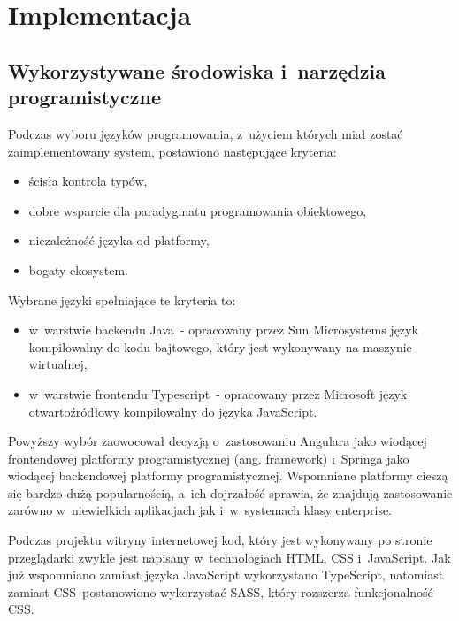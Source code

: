 \chapter{Implementacja}\label{ch:implementation}
\section{Wykorzystywane środowiska i~narzędzia programistyczne}\label{sec:dev-tools}

Podczas wyboru języków programowania, z~użyciem których miał zostać zaimplementowany system, postawiono następujące kryteria:

\begin{itemize}
    \item ścisła kontrola typów,
    \item dobre wsparcie dla paradygmatu programowania obiektowego,
    \item niezależność języka od platformy,
    \item bogaty ekosystem.
\end{itemize}

\par
Wybrane języki spełniające te kryteria to:

\begin{itemize}
    \item w~warstwie backendu Java\cite{tech:java}~- opracowany przez Sun Microsystems język kompilowalny do kodu bajtowego, który jest wykonywany na maszynie wirtualnej,
    \item w~warstwie frontendu Typescript\cite{tech:typescript}~- opracowany przez Microsoft język otwartoźródłowy kompilowalny do języka JavaScript\cite{tech:javascript}.
\end{itemize}

Powyższy wybór zaowocował decyzją o~zastosowaniu Angulara\cite{tech:angular} jako wiodącej frontendowej platformy programistycznej (ang. framework)
i~Springa\cite{tech:spring} jako wiodącej backendowej platformy programistycznej.
Wspomniane platformy cieszą się bardzo dużą popularnością, a~ich dojrzałość sprawia,
że znajdują zastosowanie zarówno w~niewielkich aplikacjach jak i~w~systemach klasy enterprise.

\par
Podczas projektu witryny internetowej kod, który jest wykonywany po stronie przeglądarki zwykle jest napisany w~technologiach HTML, CSS\cite{tech:html-css} i~JavaScript\cite{tech:javascript}.
Jak już wspomniano zamiast języka JavaScript wykorzystano TypeScript, natomiast zamiast CSS~postanowiono wykorzystać SASS\cite{tech:sass}, który rozszerza funkcjonalność CSS.

